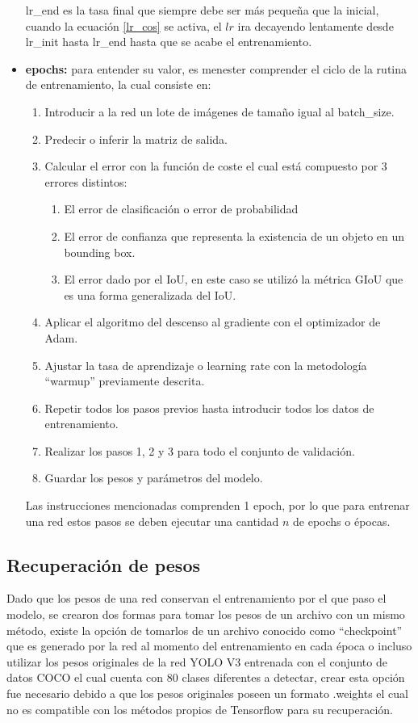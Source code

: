 \begin{itemize}
\begin{equation}
    \end{equation}
    lr\_end es la tasa final que siempre debe ser más pequeña que la inicial, cuando la ecuación \ref{lr_cos} se activa, el $lr$ ira decayendo lentamente desde lr\_init  hasta lr\_end hasta que se acabe el entrenamiento.
    \item \textbf{epochs:} para entender su valor, es menester comprender el ciclo de la rutina de entrenamiento, la cual consiste en:
    \begin{enumerate}
        \item Introducir a la red un lote de imágenes de tamaño igual al batch\_size.
        \item Predecir o inferir la matriz de salida.
        \item Calcular el error con la función de coste el cual está compuesto por 3 errores distintos:
        \begin{enumerate}
            \item El error de clasificación o error de probabilidad
            \item El error de confianza que representa la existencia de un objeto en un bounding box.
            \item El error dado por el IoU, en este caso se utilizó la métrica GIoU que es una forma generalizada del IoU.
        \end{enumerate}
        \item Aplicar el algoritmo del descenso al gradiente con el optimizador de Adam.
        \item Ajustar la tasa de aprendizaje o learning rate con la metodología ``warmup'' previamente descrita.
        \item Repetir todos los pasos previos hasta introducir todos los datos de entrenamiento.
        \item Realizar los pasos 1, 2 y 3 para todo el conjunto de validación. 
        \item Guardar los pesos y parámetros del modelo.
    \end{enumerate}
    Las instrucciones mencionadas comprenden 1 epoch, por lo que para entrenar una red estos pasos se deben ejecutar una cantidad $n$ de epochs o épocas.
\end{itemize}
\subsection{Recuperación de pesos}
Dado que los pesos de una red conservan el entrenamiento por el que paso el modelo, se crearon dos formas para tomar los pesos de un archivo con un mismo método, existe la opción de tomarlos de un archivo conocido como ``checkpoint'' que es generado por la red al momento del entrenamiento en cada época o incluso utilizar los pesos originales de la red YOLO V3 entrenada con el conjunto de datos COCO el cual cuenta con 80 clases diferentes a detectar, crear esta opción fue necesario debido a que los pesos originales poseen un formato .weights el cual no es compatible con los métodos propios de Tensorflow para su recuperación.
